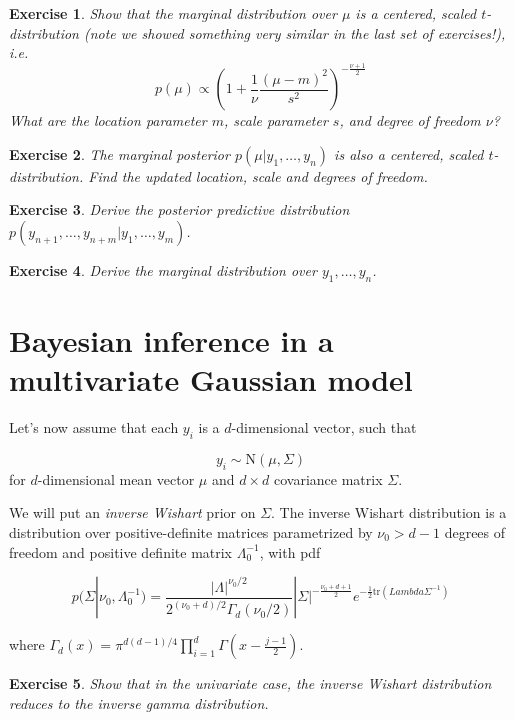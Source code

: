 \documentclass[twoside]{article}
\newcounter{lecnum}
\newtheorem{exercise}{Exercise}[lecnum]
\begin{document}
\begin{exercise}
  Show that the marginal distribution over $\mu$ is a centered, scaled $t$-distribution (note we showed something very similar in the last set of exercises!), i.e.\
  $$p(\mu) \propto \left(1+\frac{1}{\nu}\frac{(\mu-m)^2}{s^2}\right)^{-\frac{\nu+1}{2}}$$
  What are the location parameter $m$, scale parameter $s$, and degree of freedom $\nu$?
\end{exercise}

\begin{exercise}
  The marginal posterior $p(\mu|y_1,\dots, y_n)$ is also a centered, scaled $t$-distribution. Find the updated location, scale and degrees of freedom.
\end{exercise}

\begin{exercise}
  Derive the posterior predictive distribution $p(y_{n+1},\dots, y_{n+m}|y_1,\dots, y_{m})$.
\end{exercise}

\begin{exercise}
  Derive the marginal distribution over $y_1,\dots, y_n$.
\end{exercise}





\section{Bayesian inference in a multivariate Gaussian model}

Let's now assume that each $y_i$ is a $d$-dimensional vector, such that

$$y_i \sim \mbox{N}(\mu, \Sigma)$$
for $d$-dimensional mean vector $\mu$ and $d\times d$ covariance matrix $\Sigma$.

We will put an \textit{inverse Wishart} prior on $\Sigma$. The inverse Wishart distribution is a distribution over positive-definite matrices parametrized by $\nu_0>d-1$ degrees of freedom and  positive definite matrix $\Lambda_0^{-1}$, with pdf

$$p(\Sigma|\nu_0, \Lambda_0^{-1}) = \frac{|\Lambda|^{\nu_0/2}}{2^{(\nu_0 +d)/2}\Gamma_d(\nu_0/2)}|\Sigma|^{-\frac{\nu_0+d+1}{2}}e^{-\frac{1}{2}\mbox{tr}(Lambda\Sigma^{-1})}$$

where
$\Gamma_d(x) = \pi^{d(d-1)/4}\prod_{i=1}^d\Gamma\left(x-\frac{j-1}{2}\right)$.
\begin{exercise}
  Show that in the univariate case, the inverse Wishart distribution reduces to the inverse gamma distribution.
\end{exercise}
\end{document}
